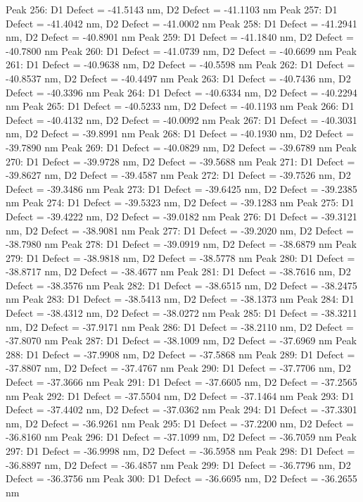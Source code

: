 \documentclass{article}
\begin{document}
Peak 256: D1 Defect = -41.5143 nm, D2 Defect = -41.1103 nm
Peak 257: D1 Defect = -41.4042 nm, D2 Defect = -41.0002 nm
Peak 258: D1 Defect = -41.2941 nm, D2 Defect = -40.8901 nm
Peak 259: D1 Defect = -41.1840 nm, D2 Defect = -40.7800 nm
Peak 260: D1 Defect = -41.0739 nm, D2 Defect = -40.6699 nm
Peak 261: D1 Defect = -40.9638 nm, D2 Defect = -40.5598 nm
Peak 262: D1 Defect = -40.8537 nm, D2 Defect = -40.4497 nm
Peak 263: D1 Defect = -40.7436 nm, D2 Defect = -40.3396 nm
Peak 264: D1 Defect = -40.6334 nm, D2 Defect = -40.2294 nm
Peak 265: D1 Defect = -40.5233 nm, D2 Defect = -40.1193 nm
Peak 266: D1 Defect = -40.4132 nm, D2 Defect = -40.0092 nm
Peak 267: D1 Defect = -40.3031 nm, D2 Defect = -39.8991 nm
Peak 268: D1 Defect = -40.1930 nm, D2 Defect = -39.7890 nm
Peak 269: D1 Defect = -40.0829 nm, D2 Defect = -39.6789 nm
Peak 270: D1 Defect = -39.9728 nm, D2 Defect = -39.5688 nm
Peak 271: D1 Defect = -39.8627 nm, D2 Defect = -39.4587 nm
Peak 272: D1 Defect = -39.7526 nm, D2 Defect = -39.3486 nm
Peak 273: D1 Defect = -39.6425 nm, D2 Defect = -39.2385 nm
Peak 274: D1 Defect = -39.5323 nm, D2 Defect = -39.1283 nm
Peak 275: D1 Defect = -39.4222 nm, D2 Defect = -39.0182 nm
Peak 276: D1 Defect = -39.3121 nm, D2 Defect = -38.9081 nm
Peak 277: D1 Defect = -39.2020 nm, D2 Defect = -38.7980 nm
Peak 278: D1 Defect = -39.0919 nm, D2 Defect = -38.6879 nm
Peak 279: D1 Defect = -38.9818 nm, D2 Defect = -38.5778 nm
Peak 280: D1 Defect = -38.8717 nm, D2 Defect = -38.4677 nm
Peak 281: D1 Defect = -38.7616 nm, D2 Defect = -38.3576 nm
Peak 282: D1 Defect = -38.6515 nm, D2 Defect = -38.2475 nm
Peak 283: D1 Defect = -38.5413 nm, D2 Defect = -38.1373 nm
Peak 284: D1 Defect = -38.4312 nm, D2 Defect = -38.0272 nm
Peak 285: D1 Defect = -38.3211 nm, D2 Defect = -37.9171 nm
Peak 286: D1 Defect = -38.2110 nm, D2 Defect = -37.8070 nm
Peak 287: D1 Defect = -38.1009 nm, D2 Defect = -37.6969 nm
Peak 288: D1 Defect = -37.9908 nm, D2 Defect = -37.5868 nm
Peak 289: D1 Defect = -37.8807 nm, D2 Defect = -37.4767 nm
Peak 290: D1 Defect = -37.7706 nm, D2 Defect = -37.3666 nm
Peak 291: D1 Defect = -37.6605 nm, D2 Defect = -37.2565 nm
Peak 292: D1 Defect = -37.5504 nm, D2 Defect = -37.1464 nm
Peak 293: D1 Defect = -37.4402 nm, D2 Defect = -37.0362 nm
Peak 294: D1 Defect = -37.3301 nm, D2 Defect = -36.9261 nm
Peak 295: D1 Defect = -37.2200 nm, D2 Defect = -36.8160 nm
Peak 296: D1 Defect = -37.1099 nm, D2 Defect = -36.7059 nm
Peak 297: D1 Defect = -36.9998 nm, D2 Defect = -36.5958 nm
Peak 298: D1 Defect = -36.8897 nm, D2 Defect = -36.4857 nm
Peak 299: D1 Defect = -36.7796 nm, D2 Defect = -36.3756 nm
Peak 300: D1 Defect = -36.6695 nm, D2 Defect = -36.2655 nm
\end{document}
